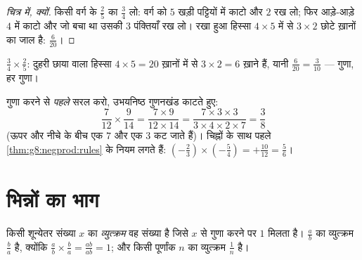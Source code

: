 \begin{proof}[चित्र में, क्यों]
किसी वर्ग के $\frac25$ का $\frac34$ लो: वर्ग को $5$ खड़ी पट्टियों में
काटो और $2$ रख लो; फिर आड़े-आड़े $4$ में काटो और जो बचा था उसकी $3$
पंक्तियाँ रख लो। रखा हुआ हिस्सा $4 \times 5$ में से $3 \times 2$
छोटे ख़ानों का जाल है:  $\frac{6}{20}$।
\end{proof}

\begin{omfigure}

{\small $\frac34 \times \frac25$: दुहरी छाया वाला हिस्सा
$4 \times 5 = 20$ ख़ानों में से $3 \times 2 = 6$ ख़ाने हैं, यानी
$\frac{6}{20} = \frac{3}{10}$ ---  गुणा, हर गुणा।}
\end{omfigure}

\begin{example}\label{ex:g8:fractions:mult}
गुणा करने से \emph{पहले} सरल करो, उभयनिष्ठ गुणनखंड काटते हुए:
\[
\frac{7}{12} \times \frac{9}{14}
= \frac{7 \times 9}{12 \times 14}
= \frac{7 \times 3 \times 3}{3 \times 4 \times 2 \times 7}
= \frac{3}{8}
\]
(ऊपर और नीचे के बीच एक $7$ और एक $3$ कट जाते हैं)। चिह्नों के साथ
पहले \cref{thm:g8:negprod:rules} के नियम लगते हैं:
$\left(-\frac23\right) \times \left(-\frac{5}{4}\right) =
+\frac{10}{12} = \frac56$।
\end{example}

\section{भिन्नों का भाग}

\begin{definition}[व्युत्क्रम]\label{def:g8:fractions:inverse}
किसी शून्येतर संख्या $x$ का \emph{व्युत्क्रम} वह
संख्या है जिसे $x$ से गुणा करने पर $1$ मिलता है। $\frac ab$ का
व्युत्क्रम $\frac ba$ है, क्योंकि
$\frac ab \times \frac ba = \frac{ab}{ab} = 1$; और किसी पूर्णांक $n$
का व्युत्क्रम $\frac1n$ है।
\end{definition}

